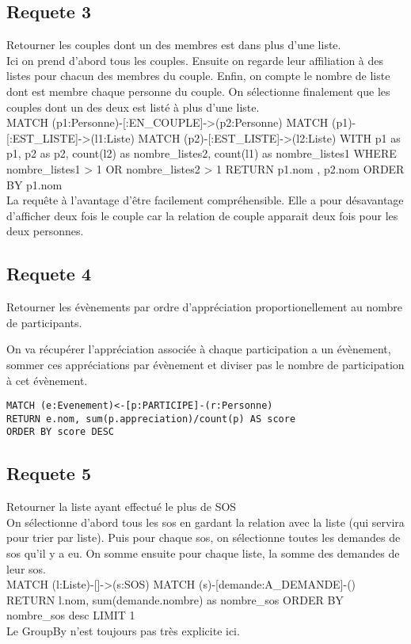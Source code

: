 \documentclass[a4paper,oneside,1pt]{article}
\begin{document}
\subsection{Requete 3}
Retourner les couples dont un des membres est dans plus d'une liste.
\\
Ici on prend d'abord tous les couples. Ensuite on regarde leur affiliation à des listes pour chacun des membres du couple. Enfin, on compte le nombre de liste dont est membre chaque personne du couple. On sélectionne finalement que les couples dont un des deux est listé à plus d'une liste.
\\
MATCH (p1:Personne)-[:EN\_COUPLE]->(p2:Personne)
MATCH (p1)-[:EST\_LISTE]->(l1:Liste)
MATCH (p2)-[:EST\_LISTE]->(l2:Liste)
WITH p1 as p1, p2 as p2, count(l2) as nombre\_listes2, count(l1) as nombre\_listes1
WHERE nombre\_listes1 > 1 OR nombre\_listes2 > 1 
RETURN p1.nom , p2.nom
ORDER BY p1.nom
\\
La requête à l'avantage d'être facilement compréhensible. Elle a pour désavantage d'afficher deux fois le couple car la relation de couple apparait deux fois pour les deux personnes.

\subsection{Requete 4}
Retourner les évènements par ordre d'appréciation proportionellement au nombre de participants.

On va récupérer l'appréciation associée à chaque participation a un évènement, sommer ces appréciations par évènement et diviser pas le nombre de participation à cet évènement.
\begin{verbatim}
MATCH (e:Evenement)<-[p:PARTICIPE]-(r:Personne)
RETURN e.nom, sum(p.appreciation)/count(p) AS score
ORDER BY score DESC
\end{verbatim}

\subsection{Requete 5}
Retourner la liste ayant effectué le plus de SOS
\\
On sélectionne d'abord tous les sos en gardant la relation avec la liste (qui servira pour trier par liste). Puis pour chaque sos, on sélectionne toutes les demandes de sos qu'il y a eu. On somme ensuite pour chaque liste, la somme des demandes de leur sos.
\\
MATCH (l:Liste)-[]->(s:SOS)
MATCH (s)-[demande:A\_DEMANDE]-()
RETURN l.nom, sum(demande.nombre) as nombre\_sos
ORDER BY nombre\_sos desc LIMIT 1
\\ 
Le GroupBy n'est toujours pas très explicite ici.
\end{document}
